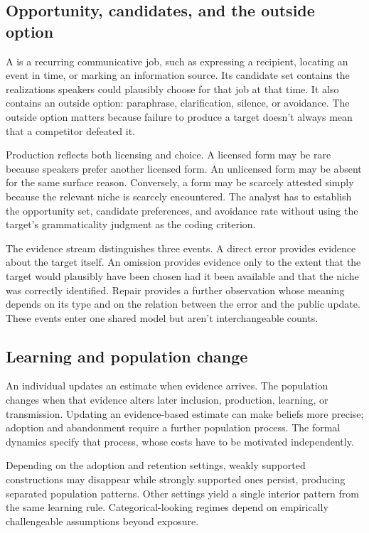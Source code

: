 \subsection{Opportunity, candidates, and the outside option}
\label{sec:niches}
\label{sec:niche-sets}
\label{sec:usage}

A  is a recurring communicative job, such as expressing a
recipient, locating an event in time, or marking an information source. Its
candidate set contains the realizations speakers could plausibly choose for
that job at that time. It also contains an outside option: paraphrase,
clarification, silence, or avoidance. The outside option matters because failure
to produce a target doesn't always mean that a competitor defeated it.

Production reflects both licensing and choice. A licensed form may be rare
because speakers prefer another licensed form. An unlicensed form may be absent
for the same surface reason. Conversely, a form may be scarcely attested simply
because the relevant niche is scarcely encountered. The analyst has to
establish the opportunity set, candidate preferences, and avoidance rate without
using the target's grammaticality judgment as the coding criterion.

The evidence stream distinguishes three events. A direct error provides evidence
about the target itself. An omission provides evidence only to the extent that
the target would plausibly have been chosen had it been available and that the
niche was correctly identified. Repair provides a further observation whose
meaning depends on its type and on the relation between the error and the public
update. These events enter one shared model but aren't interchangeable counts.

\subsection{Learning and population change}
\label{sec:update}
\label{sec:change-mechanisms}
\label{sec:motivations}

An individual updates an estimate when evidence arrives. The population changes
when that evidence alters later inclusion, production, learning, or
transmission. Updating an evidence-based estimate can make beliefs more precise;
adoption and abandonment require a further population process. The formal
dynamics specify that process, whose costs have to be motivated independently.

Depending on the adoption and retention settings, weakly supported constructions
may disappear while strongly supported ones persist, producing separated
population patterns. Other settings yield a single interior pattern from the
same learning rule. Categorical-looking regimes depend on
empirically challengeable assumptions beyond exposure.

